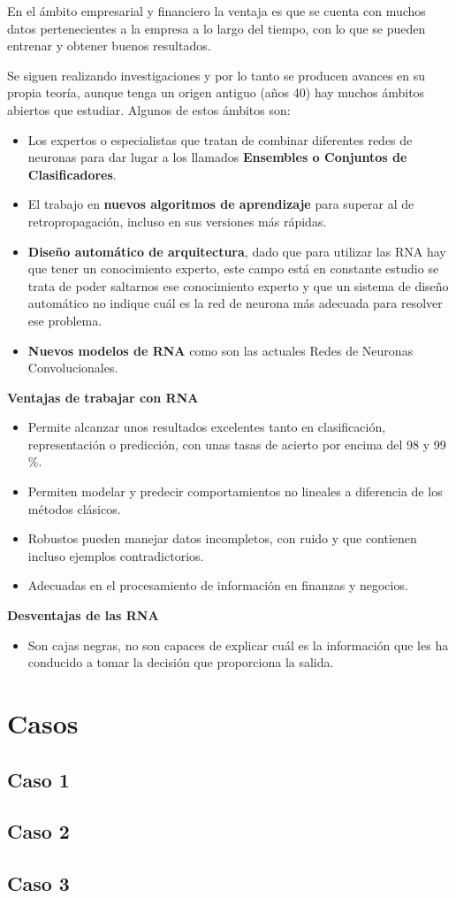 \documentclass[12pt, twoside, openright]{report} %
\begin{document}
En el ámbito empresarial y financiero la ventaja es que se cuenta con muchos datos pertenecientes a la empresa a lo largo del tiempo, con lo que se pueden entrenar y obtener buenos resultados.

Se siguen realizando investigaciones y por lo tanto se producen avances en su propia teoría, aunque tenga un origen antiguo (años 40) hay muchos ámbitos abiertos que estudiar. Algunos de estos ámbitos son:
\begin{itemize}
	\item Los expertos o especialistas que tratan de combinar diferentes redes de neuronas para dar lugar a los llamados \textbf{Ensembles o Conjuntos de Clasificadores}.
	\item El trabajo en \textbf{nuevos algoritmos de aprendizaje} para superar al de retropropagación, incluso en sus versiones más rápidas.
	\item \textbf{Diseño automático de arquitectura}, dado que para utilizar las RNA hay que tener un conocimiento experto, este campo está en constante estudio se trata de poder saltarnos ese conocimiento experto y que un sistema de diseño automático no indique cuál es la red de neurona más adecuada para resolver ese problema.
	\item \textbf{Nuevos modelos de RNA} como son las actuales Redes de Neuronas Convolucionales.
\end{itemize}

\textbf{Ventajas de trabajar con RNA}
\begin{itemize}
	\item Permite alcanzar unos resultados excelentes tanto en clasificación, representación o predicción, con unas tasas de acierto por encima del 98 y 99 \%.
	\item Permiten modelar y predecir comportamientos no lineales a diferencia de los métodos clásicos.
	\item Robustos pueden manejar datos incompletos, con ruido y que contienen incluso ejemplos contradictorios.
	\item Adecuadas en el procesamiento de información en finanzas y negocios.
\end{itemize}

\textbf{Desventajas de las RNA}
\begin{itemize}
	\item Son cajas negras, no son capaces de explicar cuál es la información que les ha conducido a tomar la decisión que proporciona la salida.
\end{itemize}


\section{Casos}
\subsection{Caso 1}
\subsection{Caso 2}
\subsection{Caso 3}
\end{document}
